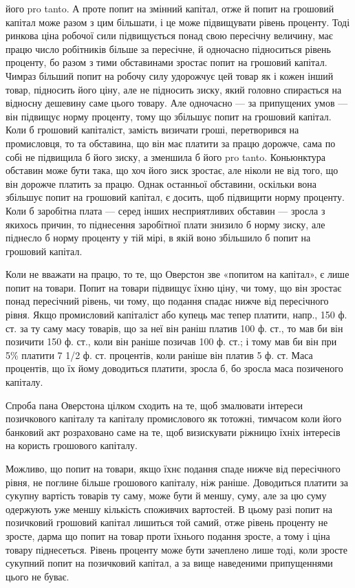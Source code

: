 його pro tanto. А проте попит на змінний капітал, отже й попит на грошовий
капітал може разом з цим більшати, і це може підвищувати рівень проценту.
Тоді ринкова ціна робочої сили підвищується понад свою пересічну величину,
має працю число робітників більше за пересічне, й одночасно підноситься
рівень проценту, бо разом з тими обставинами зростає попит на грошовий капітал.
Чимраз більший попит на робочу силу удорожчує цей товар як і кожен інший товар,
підносить його ціну, але не підносить зиску, який головно спирається на відносну
дешевину саме цього товару. Але одночасно — за припущених умов — він підвищує
норму проценту, тому що збільшує попит на грошовий капітал. Коли б
грошовий капіталіст, замість визичати гроші, перетворився на промисловця, то
та обставина, що він має платити за працю дорожче, сама по собі не підвищила
б його зиску, а зменшила б його pro tanto. Коньюнктура обставин може
бути така, що хоч його зиск зростає, але ніколи не від того, що він дорожче
платить за працю. Однак останньої обставини, оскільки вона збільшує попит на
грошовий капітал, є досить, щоб підвищити норму проценту. Коли б заробітна
плата — серед інших несприятливих обставин — зросла з якихось причин, то
піднесення заробітної плати знизило б норму зиску, але піднесло б норму проценту
у тій мірі, в якій воно збільшило б попит на грошовий капітал.

Коли не вважати на працю, то те, що Оверстон зве «попитом на капітал»,
є лише попит на товари. Попит на товари підвищує їхню ціну, чи тому, що
він зростає понад пересічний рівень, чи тому, що подання спадає нижче від
пересічного рівня. Якщо промисловий капіталіст або купець має тепер платити,
напр., 150 ф. ст. за ту саму масу товарів, що за неї він раніш платив 100
ф. ст., то мав би він позичити 150 ф. ст., коли він раніше позичав 100 ф. ст.;
і тому мав би він при 5\% платити 7 1/2 ф. ст. процентів, коли раніше він
платив 5 ф. ст. Маса процентів, що їх йому доводиться платити, зросла б,
бо зросла маса позиченого капіталу.

Спроба пана Оверстона цілком сходить на те, щоб змалювати інтереси позичкового
капіталу та капіталу промислового як тотожні, тимчасом коли його
банковий акт розраховано саме на те, щоб визискувати ріжницю їхніх інтересів
на користь грошового капіталу.

Можливо, що попит на товари, якщо їхнє подання спаде нижче від пересічного
рівня, не поглине більше грошового капіталу, ніж раніше. Доводиться
платити за сукупну вартість товарів ту саму, може бути й меншу, суму, але
за цю суму одержують уже меншу кількість споживчих вартостей. В цьому разі
попит на позичковий грошовий капітал лишиться той самий, отже рівень проценту
не зросте, дарма що попит на товар проти їхнього подання зросте, а тому
і ціна товару піднесеться. Рівень проценту може бути зачеплено лише тоді,
коли зросте сукупний попит на позичковий капітал, а за вище наведеними припущеннями цього не буває.

